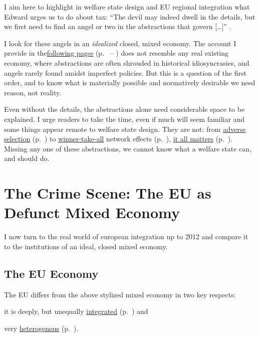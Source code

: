 \documentclass[11pt,a4paper,oneside]{article}
\begin{document}
I aim here to highlight in welfare state design and \gls{EU} regional integration what Edward \citeauthor{McCaffery2002} urges us to do about tax:
``The devil may indeed dwell in the details, but we first need to find an angel or two in the abstractions that govern [\ldots]'' \citeyearpar[117]{McCaffery2002}.

I look for these angels in an \emph{idealized} closed, mixed economy.
The account I provide in the\hyperref[sec:mixed-economy]{following pages} (p.~\pageref{sec:mixed-economy} -- \pageref{sec:EU-reality}) does not resemble any real existing economy, where abstractions are often shrouded in historical idiosyncrasies, and angels rarely found amidst imperfect policies.
But this is a question of the first order, and to know what is materially possible and normatively desirable we need reason, not reality.

Even without the details, the abstractions alone need considerable space to be explained.
I urge readers to take the time, even if much will seem familiar and some things appear remote to welfare state design.
They are not:
from \hyperref[sec:adverse-selection]{adverse selection} (p.~\pageref{sec:adverse-selection}) to \hyperref[sec:winner-take-all]{winner-take-all} network effects (p.~\pageref{sec:winner-take-all}), \hyperref[sec:why-mixed-economy-matters]{it all matters} (p.~\pageref{sec:why-mixed-economy-matters}).
Missing any one of these abstractions, we cannot know what a welfare state can, and should do.


\section{The Crime Scene: The EU as Defunct Mixed Economy} \label{sec:EU-reality}
I now turn to the real world of european integration up to 2012 and compare it to the institutions of an ideal, closed mixed economy.

\subsection{The EU Economy}
The \gls{EU} differs from the above stylized mixed economy in two key respects:
\begin{inparaenum}[1)]
	\item it is deeply, but unequally \hyperref[sec:EU-Acquis]{integrated} (p.~\pageref{sec:EU-Acquis}) and
	\item very \hyperref[sec:sources-of-wealth]{heterogenous} (p.~\pageref{sec:sources-of-wealth}).
\end{inparaenum}
\end{document}
